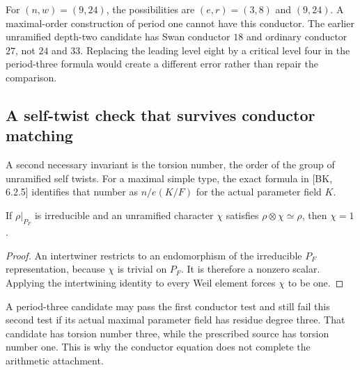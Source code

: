 For $(n,w)=(9,24)$, the possibilities are $(e,r)=(3,8)$ and $(9,24)$. A maximal-order construction of period one cannot have this conductor. The earlier unramified depth-two candidate has Swan conductor $18$ and ordinary conductor $27$, not $24$ and $33$. Replacing the leading level eight by a critical level four in the period-three formula would create a different error rather than repair the comparison.

\subsection{A self-twist check that survives conductor matching}
A second necessary invariant is the torsion number, the order of the group of unramified self twists. For a maximal simple type, the exact formula in [BK, 6.2.5] identifies that number as $n/e(K/F)$ for the actual parameter field $K$.

\begin{lemma}\label{lem:source-twist}
If $\rho|_{P_F}$ is irreducible and an unramified character $\chi$ satisfies $\rho\otimes\chi\simeq\rho$, then $\chi=1$.
\end{lemma}
\begin{proof}
An intertwiner restricts to an endomorphism of the irreducible $P_F$ representation, because $\chi$ is trivial on $P_F$. It is therefore a nonzero scalar. Applying the intertwining identity to every Weil element forces $\chi$ to be one.
\end{proof}

A period-three candidate may pass the first conductor test and still fail this second test if its actual maximal parameter field has residue degree three. That candidate has torsion number three, while the prescribed source has torsion number one. This is why the conductor equation does not complete the arithmetic attachment.
